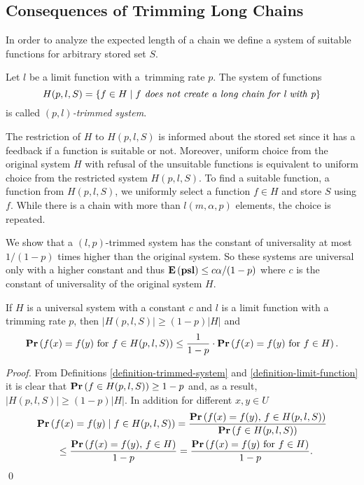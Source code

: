 \subsection{Consequences of Trimming Long Chains}
In order to analyze the expected length of a chain we define a system of suitable functions for arbitrary stored set $S$.
\begin{definition}
\label{definition-trimmed-system}
Let $l$ be a limit function with a~trimming rate $p$. The system of functions \[ H(p, l, S) = \{ f \in H \mid f \textit{ does not create a long chain for l with p} \} \] is called \emph{$(p, l)$-trimmed system}.
\end{definition}

The restriction of $H$ to $H(p, l, S)$ is informed about the stored set since it has a feedback if a function is suitable or not. Moreover, uniform choice from the original system $H$ with refusal of the unsuitable functions is equivalent to uniform choice from the restricted system $H(p, l, S)$. To find a suitable function, a function from $H(p, l, S)$, we uniformly select a function $f \in H$ and store $S$ using $f$. While there is a chain with more than $l(m, \alpha, p)$ elements, the choice is repeated.

We show that a $(l, p)$-trimmed system has the constant of universality at most $1 / (1 - p)$ times higher than the original system. So these systems are universal only with a higher constant and thus $\mathbf{E}\left(\mathbf{psl}\right) \leq c\alpha/(1-p)$ where $c$ is the constant of universality of the original system $H$.

\begin{lemma}
\label{lemma-trimmed-system}
If $H$ is a universal system with a constant $c$ and $l$ is a limit function with a trimming rate $p$, then $|H(p, l, S)| \geq (1 - p)|H|$ and  \[ \mathbf{Pr}\left(f(x) = f(y) \mbox{ for } f \in H(p, l, S)\right) \leq \frac{1}{1 - p} \cdot \mathbf{Pr}\left(f(x) = f(y) \mbox{ for } f \in H\right). \]
\end{lemma}
\begin{proof}
From Definitions \ref{definition-trimmed-system} and \ref{definition-limit-function} it is clear that $\mathbf{Pr}\left(f \in H(p, l, S)\right) \geq 1 - p$ and, as a result, $|H(p, l, S)| \geq (1 - p)|H|$. In addition for different $x, y \in U$ 
\[
\begin{split}
& \mathbf{Pr}\left(f(x) = f(y) \mid f \in H(p, l, S)\right) 
	= \frac{\mathbf{Pr}\left(f(x) = f(y),\, f \in H(p, l, S)\right)}{\mathbf{Pr}\left(f \in H(p, l, S)\right)} \\
	& \qquad \leq \frac{\mathbf{Pr}\left(f(x) = f(y),\, f \in H\right)}{1 - p} = \frac{\mathbf{Pr}\left(f(x) = f(y) \mbox{ for } f \in H\right)}{1 - p}. \\
\end{split}
\]
\qed
\end{proof}

